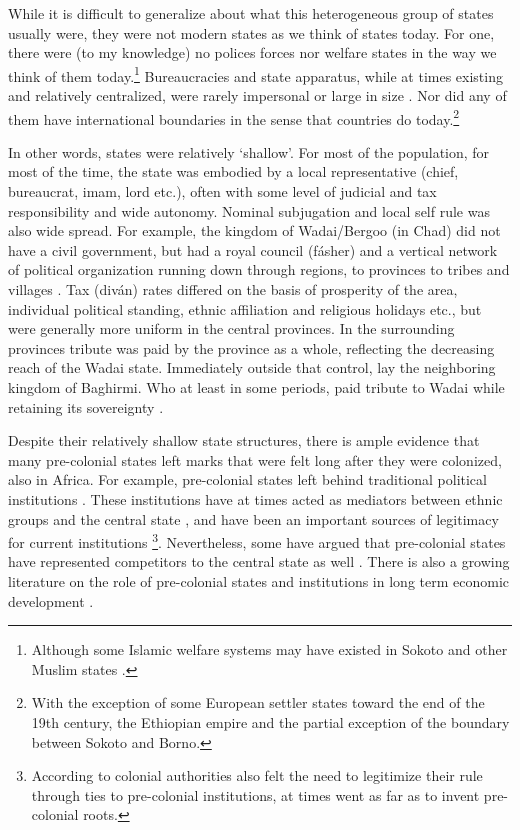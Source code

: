 \documentclass[12pt]{article}
\begin{document}
While it is difficult to generalize about what this heterogeneous group of
states usually were, they were not modern states as we think of states today.
For one, there were (to my knowledge) no polices forces nor welfare states in
the way we think of them today.\footnote{Although some Islamic welfare systems
may have existed in Sokoto \citep{Buba_2018} and other Muslim states
\citep{WeissHolger2002SwiM}.} Bureaucracies and state apparatus, while at times
existing and relatively centralized, were rarely impersonal or large in size
\citep{Herbst2014}. Nor did any of them have international boundaries in the
sense that countries do today.\footnote{With the exception of some European settler
states toward the end of the 19th century, the Ethiopian empire and the partial
exception of the boundary between Sokoto and Borno.}


In other words, states were relatively `shallow'. For most of the
population, for most of the time, the state was embodied by a local
representative (chief, bureaucrat, imam, lord etc.), often with some level of
judicial and tax responsibility and wide autonomy. Nominal subjugation and local
self rule was also wide spread. For example, the kingdom of Wadai/Bergoo (in
Chad) did not have a civil government, but had a royal council (fásher) and a
vertical network of political organization running down through regions, to
provinces to tribes and villages \citep{barth1857travels}. Tax (diván) rates
differed on the basis of prosperity of the area, individual political standing,
ethnic affiliation and religious holidays etc., but were generally more uniform
in the central provinces. In the surrounding provinces tribute was paid by the
province as a whole, reflecting the decreasing reach of the Wadai state.
Immediately outside that control, lay the neighboring kingdom of Baghirmi. Who
at least in some periods, paid tribute to Wadai while retaining its sovereignty
\citep{barth1857travels}.

Despite their relatively shallow state structures, there is ample evidence that
many pre-colonial states left marks that were felt long after they were
colonized, also in Africa. For example, pre-colonial states left behind
traditional political institutions \citep{Beall_2005, Holzinger_2020,
Neupert_Wentz_2021, Ubink_2008}. These institutions have at times acted as
mediators between ethnic groups and the central state \citep{boone2014property,
Englebert2002}, and have been an important sources of legitimacy for current
institutions \citep{Wig2016}\footnote{According to \citet{mamdani2018citizen}
	colonial authorities also felt the need to legitimize their rule through
	ties to pre-colonial institutions, at times went as far as to invent
pre-colonial roots.}. Nevertheless, some have argued that pre-colonial states
have represented competitors to the central state as well \citep{Herbst2014}.
There is also a growing literature on the role of pre-colonial states and
institutions in long term economic development \citep{Michalopoulos2018,
Acemoglu2014, Gennaioli2007, Bockstette2002, Wilfahrt_2021}.
\end{document}
